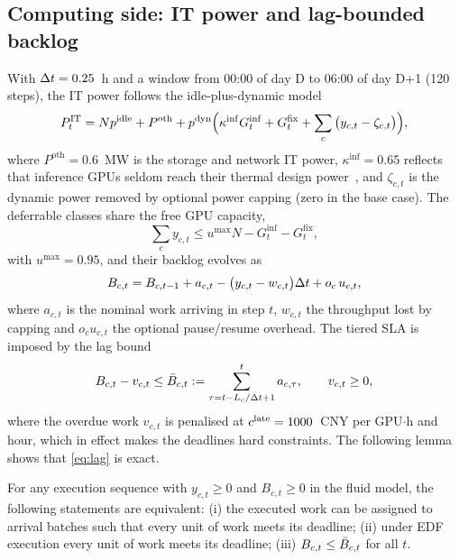\subsection{Computing side: IT power and lag-bounded backlog}
\label{sec:computing}

With $\Delta t=0.25$~h and a window from 00:00 of day D to 06:00 of day D+1 (120 steps), the IT power follows the
idle-plus-dynamic model~\cite{fan2007}
\begin{equation}
P^{\mathrm{IT}}_t=Np^{\mathrm{idle}}+P^{\mathrm{oth}}+p^{\mathrm{dyn}}\Big(\kappa^{\mathrm{inf}}G^{\mathrm{inf}}_t+G^{\mathrm{fix}}_t+\sum_{c}\big(y_{c,t}-\zeta_{c,t}\big)\Big),
\label{eq:pit}
\end{equation}
where $P^{\mathrm{oth}}=0.6$~MW is the storage and network IT power, $\kappa^{\mathrm{inf}}=0.65$ reflects that
inference GPUs seldom reach their thermal design power~\cite{patel2024}, and $\zeta_{c,t}$ is the dynamic power removed
by optional power capping (zero in the base case). The deferrable classes share the free GPU capacity,
\begin{equation}
\sum_c y_{c,t}\le u^{\max}N-G^{\mathrm{inf}}_t-G^{\mathrm{fix}}_t ,
\label{eq:gpucap}
\end{equation}
with $u^{\max}=0.95$, and their backlog evolves as
\begin{equation}
B_{c,t}=B_{c,t-1}+a_{c,t}-\big(y_{c,t}-w_{c,t}\big)\Delta t+o_c\,u_{c,t},
\label{eq:backlog}
\end{equation}
where $a_{c,t}$ is the nominal work arriving in step $t$, $w_{c,t}$ the throughput lost by capping and $o_c u_{c,t}$
the optional pause/resume overhead. The tiered SLA is imposed by the lag bound
\begin{equation}
B_{c,t}-v_{c,t}\le\bar B_{c,t}:=\sum_{\tau=t-L_c/\Delta t+1}^{t}a_{c,\tau},\qquad v_{c,t}\ge0,
\label{eq:lag}
\end{equation}
where the overdue work $v_{c,t}$ is penalised at $c^{\mathrm{late}}=1000$~CNY per GPU$\cdot$h and hour, which in effect makes
the deadlines hard constraints. The following lemma shows that \eqref{eq:lag} is exact.

\begin{lemma}\label{lem:edf}
For any execution sequence with $y_{c,t}\ge0$ and $B_{c,t}\ge0$ in the fluid model, the following statements are
equivalent: (i) the executed work can be assigned to arrival batches such that every unit of work meets its deadline;
(ii) under EDF execution every unit of work meets its deadline; (iii) $B_{c,t}\le\bar B_{c,t}$ for all $t$.
\end{lemma}

